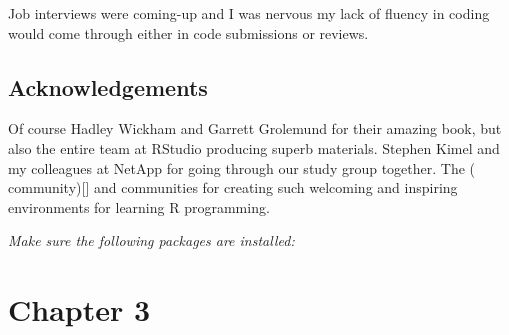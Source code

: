 \documentclass[]{book}
\theoremstyle{definition}
\theoremstyle{definition}
\theoremstyle{definition}
\theoremstyle{remark}
\begin{document}
Job interviews were coming-up and I was nervous my lack of fluency in
coding would come through either in code submissions or reviews.

\hypertarget{acknowledgements}{%
\section{Acknowledgements}\label{acknowledgements}}

Of course Hadley Wickham and Garrett Grolemund for their amazing book,
but also the entire team at RStudio producing superb materials. Stephen
Kimel and my colleagues at NetApp for going through our study group
together. The (\citet{R4DS} community){[}{]} and \citet{rstats}
communities for creating such welcoming and inspiring environments for
learning R programming.

\emph{Make sure the following packages are installed:}

\hypertarget{chapter-3}{%
\chapter{Chapter 3}\label{chapter-3}}
\end{document}
